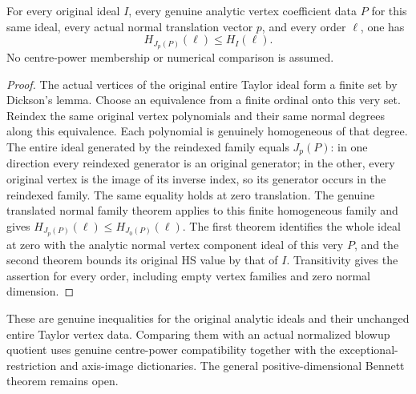 \begin{theorem}
\label{hir:actual-every-translated-normal-vertex-hs-bound}
\leanok
For every original ideal $I$, every genuine analytic vertex coefficient
data $P$ for this same ideal, every actual normal translation vector
$p$, and every order $\ell$, one has
\[
 H_{J_p(P)}(\ell)\le H_I(\ell).
\]
No centre-power membership or numerical comparison is assumed.
\end{theorem}
\begin{proof}
The actual vertices of the original entire Taylor ideal form a finite
set by Dickson's lemma. Choose an equivalence from a finite ordinal onto
this very set. Reindex the same original vertex polynomials and their
same normal degrees along this equivalence. Each polynomial is genuinely
homogeneous of that degree. The entire ideal generated by the reindexed
family equals $J_p(P)$: in one direction every reindexed generator is
an original generator; in the other, every original vertex is the image
of its inverse index, so its generator occurs in the reindexed family.
The same equality holds at zero translation. The genuine translated
normal family theorem applies to this finite homogeneous family and
gives $H_{J_p(P)}(\ell)\le H_{J_0(P)}(\ell)$. The first theorem identifies
the whole ideal at zero with the analytic normal vertex component ideal
of this very $P$, and the second theorem bounds its original HS value
by that of $I$. Transitivity gives the assertion for every order,
including empty vertex families and zero normal dimension.
\end{proof}

These are genuine inequalities for the original analytic ideals and
their unchanged entire Taylor vertex data. Comparing them with an
actual normalized blowup quotient uses genuine centre-power
compatibility together with the exceptional-restriction and axis-image
dictionaries.
The general positive-dimensional Bennett theorem remains open.
